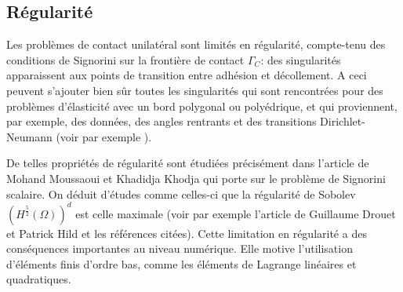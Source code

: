 \documentclass[11pt]{book}
\newtheorem{remark}[theorem]{Remarque}
\newcommand{\beqs}{\begin{eqnarray*}}
\newcommand{\eeqs}{\end{eqnarray*}}
\newcommand{\br}{\begin{remark}}
\newcommand{\er}{\end{remark}}
\def\u{{\bf u}}
\def\vv{{\bf v}}
\def\w{{\bf w}}
\def\K{{\bf K}}
\newcommand{\R}{\mathbb{R}}
\begin{document}

\subsection{Régularit\'e}

Les problèmes de contact unilatéral sont limités en régularité, compte-tenu des conditions de Signorini sur la frontière de contact $\Gamma_C$: des singularités apparaissent aux points de transition entre adhésion et décollement. A ceci peuvent s'ajouter bien sûr toutes les singularités qui sont rencontrées pour des problèmes d'élasticité avec un bord polygonal ou polyédrique, et qui proviennent, par exemple, des données, des angles rentrants et des transitions Dirichlet-Neumann (voir par exemple \cite{grisvard-85,grisvard-86}). 

De telles propriétés de régularité sont étudiées précisément dans l'article de Mohand Moussaoui et Khadidja Khodja
\cite{moussaoui-khodja-92} qui porte sur le problème de Signorini scalaire. %
On déduit d'études comme celles-ci que la régularité de Sobolev $(H^{\frac52} (\Omega))^d$ est celle maximale (voir par exemple l'article de Guillaume Drouet et Patrick Hild \cite{drouet-hild-15} et les références citées). 
Cette limitation en régularité a des conséquences importantes au niveau numérique. Elle motive l'utilisation d'éléments finis d'ordre bas, comme les éléments de Lagrange linéaires et quadratiques.
\end{document}
